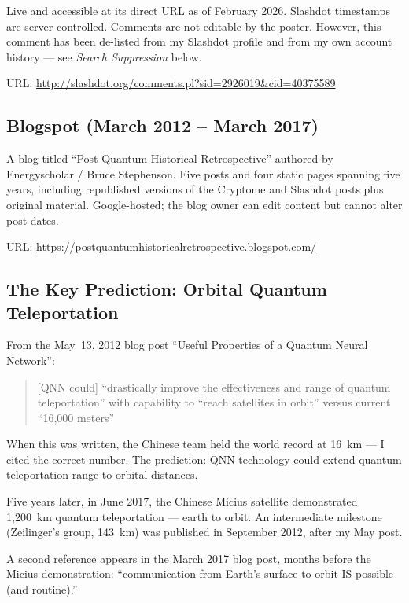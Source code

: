 Live and accessible at its direct URL as of February 2026. Slashdot timestamps are server-controlled. Comments are not editable by the poster. However, this comment has been de-listed from my Slashdot profile and from my own account history --- see \textit{Search Suppression} below.

URL: \url{http://slashdot.org/comments.pl?sid=2926019&cid=40375589}

\subsection*{Blogspot (March 2012 -- March 2017)}
\label{pos34:blogspot-march-2012-march-2017}

A blog titled ``Post-Quantum Historical Retrospective'' authored by Energyscholar / Bruce Stephenson. Five posts and four static pages spanning five years, including republished versions of the Cryptome and Slashdot posts plus original material. Google-hosted; the blog owner can edit content but cannot alter post dates.

URL: \url{https://postquantumhistoricalretrospective.blogspot.com/}

\subsection*{The Key Prediction: Orbital Quantum Teleportation}
\label{pos34:the-key-prediction-orbital-quantum-teleportation}

From the May~13, 2012 blog post ``Useful Properties of a Quantum Neural Network'':

\begin{quote}
[QNN could] ``drastically improve the effectiveness and range of quantum teleportation'' with capability to ``reach satellites in orbit'' versus current ``16,000 meters''
\end{quote}

When this was written, the Chinese team held the world record at 16~km --- I cited the correct number. The prediction: QNN technology could extend quantum teleportation range to orbital distances.

Five years later, in June 2017, the Chinese Micius satellite demonstrated 1,200~km quantum teleportation --- earth to orbit. An intermediate milestone (Zeilinger's group, 143~km) was published in September 2012, after my May post.

A second reference appears in the March 2017 blog post, months before the Micius demonstration: ``communication from Earth's surface to orbit IS possible (and routine).''

